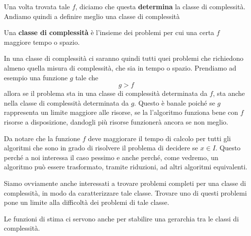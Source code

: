 Una volta trovata tale $f$, diciamo che questa \textbf{determina}
la classe di complessità. Andiamo quindi a definire meglio una
classe di complessità

\begin{definition}
	Una \textbf{classe di complessità} è l'insieme dei problemi
	per cui una certa $f$ maggiore tempo o spazio.
\end{definition}

In una classe di complessità ci saranno quindi tutti quei
problemi che richiedono almeno quella misura di complessità, che
sia in tempo o spazio. Prendiamo ad esempio una funzione $g$
tale che
\[ g > f \]
allora se il problema sta in una classe di complessità
determinata da $f$, sta anche nella classe di complessità
determinata da $g$. Questo è banale poiché se $g$ rappresenta un
limite maggiore alle risorse, se la l'algoritmo funziona bene
con $f$ risorse a disposizione, dandogli più risorse funzionerà
ancora se non meglio.

Da notare che la funzione $f$ deve maggiorare il tempo di
calcolo per tutti gli algoritmi che sono in grado di risolvere
il problema di decidere se $x \in I$. Questo perché a noi
interessa il caso pessimo e anche perché, come vedremo, un
algoritmo può essere trasformato, tramite riduzioni, ad altri
algoritmi equivalenti.

Siamo ovviamente anche interessati a trovare problemi completi
per una classe di complessità, in modo da caratterizzare tale
classe. Trovare uno di questi problemi pone un limite alla
difficoltà dei problemi di tale classe.

Le funzioni di stima ci servono anche per stabilire una
gerarchia tra le classi di complessità.
